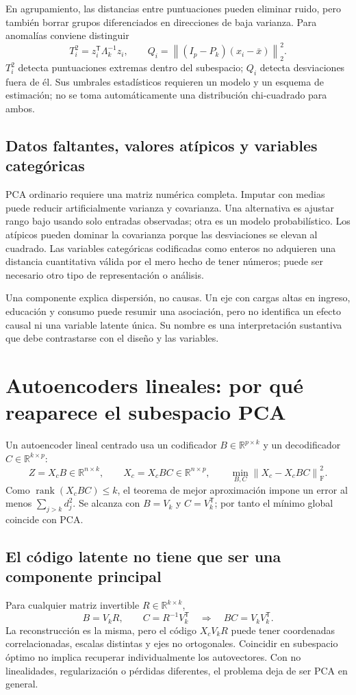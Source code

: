 \documentclass[11pt,a4paper]{article}
\newcommand{\R}{\mathbb R}
\newcommand{\T}{^{\mathsf T}}
\newcommand{\norm}[1]{\left\lVert #1\right\rVert}
\DeclareMathOperator{\rank}{rank}
\newcommand{\F}{_{\mathrm F}}
\theoremstyle{definition}
\begin{document}
En agrupamiento, las distancias entre puntuaciones pueden eliminar ruido, pero también borrar grupos diferenciados en direcciones de baja varianza. Para anomalías conviene distinguir
\[
T_i^2=z_i\T\Lambda_k^{-1}z_i,\qquad
Q_i=\norm{(I_p-P_k)(x_i-\bar x)}_2^2.
\]
$T_i^2$ detecta puntuaciones extremas dentro del subespacio; $Q_i$ detecta desviaciones fuera de él. Sus umbrales estadísticos requieren un modelo y un esquema de estimación; no se toma automáticamente una distribución chi-cuadrado para ambos.
\subsection{Datos faltantes, valores atípicos y variables categóricas}
PCA ordinario requiere una matriz numérica completa. Imputar con medias puede reducir artificialmente varianza y covarianza. Una alternativa es ajustar rango bajo usando solo entradas observadas; otra es un modelo probabilístico. Los atípicos pueden dominar la covarianza porque las desviaciones se elevan al cuadrado. Las variables categóricas codificadas como enteros no adquieren una distancia cuantitativa válida por el mero hecho de tener números; puede ser necesario otro tipo de representación o análisis.
\begin{cuidado}
Una componente explica dispersión, no causas. Un eje con cargas altas en ingreso, educación y consumo puede resumir una asociación, pero no identifica un efecto causal ni una variable latente única. Su nombre es una interpretación sustantiva que debe contrastarse con el diseño y las variables.
\end{cuidado}

\section{Autoencoders lineales: por qué reaparece el subespacio PCA}
Un autoencoder lineal centrado usa un codificador $B\in\R^{p\times k}$ y un decodificador $C\in\R^{k\times p}$:
\[
Z=X_cB\in\R^{n\times k},\qquad\widehat X_c=X_cBC\in\R^{n\times p},\qquad
\min_{B,C}\norm{X_c-X_cBC}\F^2.
\]
Como $\rank(X_cBC)\le k$, el teorema de mejor aproximación impone un error al menos $\sum_{j>k}d_j^2$. Se alcanza con $B=V_k$ y $C=V_k\T$; por tanto el mínimo global coincide con PCA.
\subsection{El código latente no tiene que ser una componente principal}
Para cualquier matriz invertible $R\in\R^{k\times k}$,
\[
B=V_kR,\qquad C=R^{-1}V_k\T\quad\Rightarrow\quad BC=V_kV_k\T.
\]
La reconstrucción es la misma, pero el código $X_cV_kR$ puede tener coordenadas correlacionadas, escalas distintas y ejes no ortogonales. Coincidir en subespacio óptimo no implica recuperar individualmente los autovectores. Con no linealidades, regularización o pérdidas diferentes, el problema deja de ser PCA en general.
\end{document}
